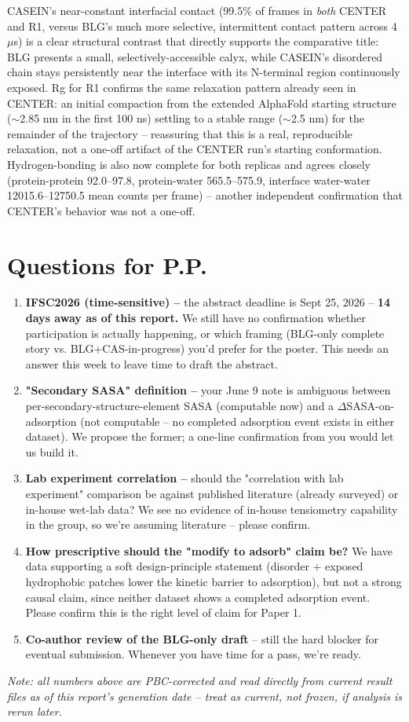 \documentclass[11pt,a4paper]{article}
\begin{document}
CASEIN's near-constant interfacial contact (99.5\% of frames in \emph{both} CENTER and R1,
versus BLG's much more selective, intermittent contact pattern across 4$\mu$s) is a clear
structural contrast that
directly supports the comparative title: BLG presents a small, selectively-accessible
calyx, while CASEIN's disordered chain stays persistently near the interface with its
N-terminal region continuously exposed. Rg for R1 confirms the same relaxation pattern
already seen in CENTER: an initial compaction from the extended AlphaFold starting
structure ($\sim$2.85 nm in the first 100 ns) settling to a stable range ($\sim$2.5 nm)
for the remainder of the trajectory -- reassuring that this is a real, reproducible
relaxation, not a one-off artifact of the CENTER run's starting conformation.
Hydrogen-bonding is also now complete for both replicas and agrees closely
(protein-protein 92.0--97.8, protein-water 565.5--575.9, interface water-water
12015.6--12750.5 mean counts per frame) -- another independent confirmation that
CENTER's behavior was not a one-off.

\section{Questions for P.P.}

\begin{enumerate}[leftmargin=1.5em]
  \item \textbf{IFSC2026 (time-sensitive) --} the abstract deadline is Sept 25, 2026 --
  \textbf{14 days away as of this report.} We still have no confirmation whether
  participation is actually happening, or which framing (BLG-only complete story vs.
  BLG+CAS-in-progress) you'd prefer for the poster. This needs an answer this week to
  leave time to draft the abstract.
  \item \textbf{"Secondary SASA" definition --} your June 9 note is ambiguous between
  per-secondary-structure-element SASA (computable now) and a $\Delta$SASA-on-adsorption
  (not computable -- no completed adsorption event exists in either dataset). We propose
  the former; a one-line confirmation from you would let us build it.
  \item \textbf{Lab experiment correlation --} should the "correlation with lab experiment"
  comparison be against published literature (already surveyed) or in-house wet-lab data?
  We see no evidence of in-house tensiometry capability in the group, so we're assuming
  literature -- please confirm.
  \item \textbf{How prescriptive should the "modify to adsorb" claim be?} We have
  data supporting a soft design-principle statement (disorder + exposed hydrophobic
  patches lower the kinetic barrier to adsorption), but not a strong causal claim, since
  neither dataset shows a completed adsorption event. Please confirm this is the right
  level of claim for Paper 1.
  \item \textbf{Co-author review of the BLG-only draft} -- still the hard blocker for
  eventual submission. Whenever you have time for a pass, we're ready.
\end{enumerate}

\vspace{1em}
\noindent\small \textit{Note: all numbers above are PBC-corrected and read directly from
current result files as of this report's generation date -- treat as current, not frozen,
if analysis is rerun later.}
\end{document}
